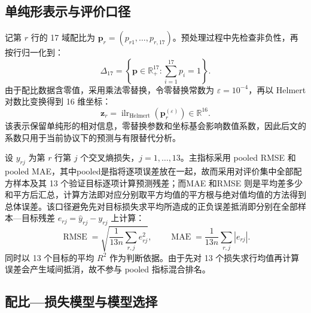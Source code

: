 \subsection{单纯形表示与评价口径}

记第 $r$ 行的 17 域配比为 $\boldsymbol p_r=(p_{r1},\ldots,p_{r,17})$。预处理过程中先检查非负性，再按行归一化到：
\begin{equation}
  \Delta_{17}=\left\{\boldsymbol p\in\mathbb R_+^{17}:\sum_{i=1}^{17}p_i=1\right\}.
  \label{eq:q13-simplex}
\end{equation}
由于配比数据含零值，采用乘法零替换，令零替换常数为 $\varepsilon=10^{-4}$，再以 Helmert 对数比变换得到 16 维坐标：
\begin{equation}
  \boldsymbol z_r=\operatorname{ilr}_{\mathrm{Helmert}}\!\left(\boldsymbol p_r^{(\varepsilon)}\right)\in\mathbb R^{16}.
  \label{eq:q13-ilr}
\end{equation}
该表示保留单纯形的相对信息，零替换参数和坐标基会影响数值系数，因此后文的系数只用于当前协议下的预测与有限替代分析。

设 $y_{rj}$ 为第 $r$ 行第 $j$ 个交叉熵损失，$j=1,\ldots,13$。主指标采用 pooled RMSE 和 pooled MAE，其中pooled是指将逐项误差放在一起，故而采用对评价集中全部配方样本及其 13 个验证目标逐项计算预测残差；而MAE 和RMSE 则是平均差多少和平方后汇总，计算方法即对应分别取平方均值的平方根与绝对值均值的方法得到总体误差。该口径避免先对目标损失求平均所造成的正负误差抵消即分别在全部样本—目标残差 $e_{rj}=\hat y_{rj}-y_{rj}$ 上计算：
\begin{equation}
  \operatorname{RMSE}=\sqrt{\frac{1}{13n}\sum_{r,j}e_{rj}^2},\qquad
  \operatorname{MAE}=\frac{1}{13n}\sum_{r,j}|e_{rj}|.
  \label{eq:q13-metrics}
\end{equation}
同时以 13 个目标的平均 $R^2$ 作为判断依据。由于先对 13 个损失求行均值再计算误差会产生域间抵消，故不参与 pooled 指标混合排名。

\subsection{配比—损失模型与模型选择}

